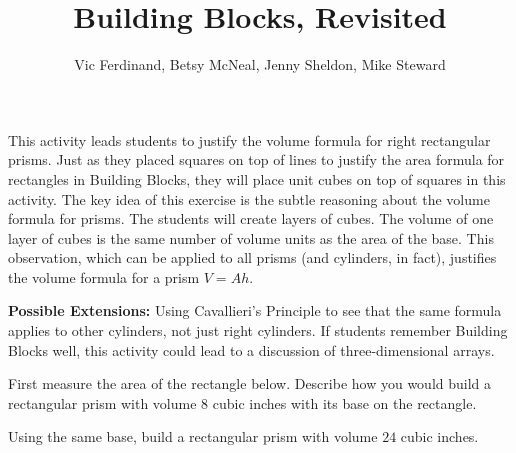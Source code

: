 \documentclass{ximera}
\title{Building Blocks, Revisited}
\author{Vic Ferdinand, Betsy McNeal, Jenny Sheldon, Mike Steward}
\begin{document}
\begin{abstract}
\end{abstract}
\maketitle

\begin{instructorIntro}
This activity leads students to justify the volume formula for right rectangular prisms.  Just as they placed squares on top of lines to justify the area formula for rectangles in Building Blocks, they will place unit cubes on top of squares in this activity.  The key idea of this exercise is the subtle reasoning about the volume formula for prisms.  The students will create layers of cubes.  The volume of one layer of cubes is the same number of volume units as the area of the base.  This observation, which can be applied to all prisms (and cylinders, in fact), justifies the volume formula for a prism $V = Ah$.


{\bf Possible Extensions:}
Using Cavallieri's Principle to see that the same formula applies to other cylinders, not just right cylinders. If students remember Building Blocks well, this activity could lead to a discussion of three-dimensional arrays.

\end{instructorIntro}


\begin{problem}
First measure the area of the rectangle below.  Describe how you would build a rectangular prism with volume $8$ cubic inches with its base on the rectangle.


\end{problem}

\begin{problem}
Using the same base, build a rectangular prism with volume $24$ cubic inches.

\end{problem}
\end{document}
